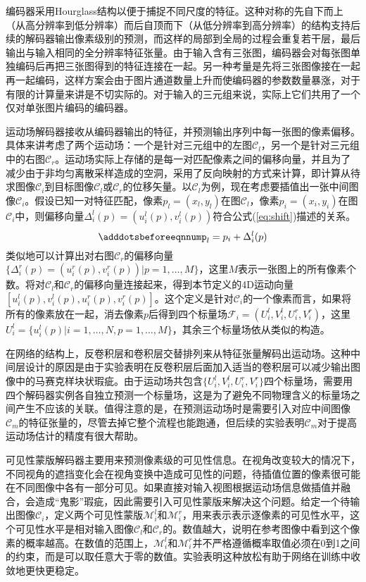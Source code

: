 编码器采用Hourglass结构\citep{newell2016}以便于捕捉不同尺度的特征。这种对称的先自下而上（从高分辨率到低分辨率）而后自顶而下（从低分辨率到高分辨率）的结构支持后续的解码器输出像素级别的预测，而这样的局部到全局的过程会重复若干层，最后输出与输入相同的全分辨率特征张量。由于输入含有三张图，编码器会对每张图单独编码后再把三张图得到的特征连接在一起。另一种考量是先将三张图像接在一起再一起编码，这样方案会由于图片通道数量上升而使编码器的参数数量暴涨，对于有限的计算量来讲是不切实际的。对于输入的三元组来说，实际上它们共用了一个仅对单张图片编码的编码器。

运动场解码器接收从编码器输出的特征，并预测输出序列中每一张图的像素偏移。具体来讲考虑了两个运动场：一个是针对三元组中的左图$\mathcal{C}_l$，另一个是针对三元组中的右图$\mathcal{C}_r$。运动场实际上存储的是每一对匹配像素之间的偏移向量，并且为了减少由于非均匀离散采样造成的空洞，采用了反向映射的方式来计算，即计算从待求图像$\mathcal{C}_i$到目标图像$\mathcal{C}_l$或$\mathcal{C}_r$的位移矢量。以$\mathcal{C}_l$为例，现在考虑要插值出一张中间图像$\mathcal{C}_i$。假设已知一对特征匹配，像素$p_l=(x_l, y_l)$在图$\mathcal{C}_l$，像素$p_i=(x_i, y_i)$在图$\mathcal{C}_i$中，则偏移向量$\Delta_i^l(p)=(u_i^l(p), v_i^l(p))$符合公式(\ref{eq:shift})描述的关系。
\begin{equation}\label{eq:shift}
    \adddotsbeforeeqnnum%
    p_l = p_i + \Delta_i^l(p)
\end{equation}
类似地可以计算出对右图$\mathcal{C}_r$的偏移向量$\{\Delta_i^r(p)=(u_i^r(p), v_i^r(p)) | p = 1, \dots, M\}$，这里$M$表示一张图上的所有像素个数。将对$\mathcal{C}_l$和$\mathcal{C}_r$的偏移向量连接起来，得到本节定义的4D运动向量$[u_i^l(p), v_i^l(p), u_i^r(p), v_i^r(p)]$。这个定义是针对$\mathcal{C}_i$的一个像素而言，如果将所有的像素放在一起，消去像素$p$后得到四个标量场$\mathcal{F}_i=(U_i^l, V_i^l, U_i^r, V_i^r)$，这里$U_i^l=\{u_i^l(p)|i=1,\dots,N, p=1, \dots, M \}$，其余三个标量场依从类似的构造。

在网络的结构上，反卷积层和卷积层交替排列来从特征张量解码出运动场。这种中间层设计的原因是由于实验表明在反卷积层后面加入适当的卷积层可以减少输出图像中的马赛克样块状瑕疵。由于运动场共包含$\{U_i^l, V_i^l, U_i^r, V_i^r\}$四个标量场，需要用四个解码器实例各自独立预测一个标量场，这是为了避免不同物理含义的标量场之间产生不应该的关联。值得注意的是，在预测运动场时是需要引入对应中间图像$\mathcal{C}_m$的特征张量的，尽管去掉它整个流程也能跑通，但后续的实验表明$\mathcal{C}_m$对于提高运动场估计的精度有很大帮助。

可见性蒙版解码器主要用来预测像素级的可见性信息。在视角改变较大的情况下，不同视角的遮挡变化会在视角变换中造成可见性的问题，待插值位置的像素很可能在不同图像中各有一部分可见。如果直接对输入视图根据运动场信息做插值并融合，会造成“鬼影”瑕疵，因此需要引入可见性蒙版来解决这个问题。给定一个待输出图像$\mathcal{C}_i$，定义两个可见性蒙版$\mathcal{M}_i^l$和$\mathcal{M}_i^r$，用来表示表示逐像素的可见性水平，这个可见性水平是相对输入图像$\mathcal{C}_l$和$\mathcal{C}_r$的。数值越大，说明在参考图像中看到这个像素的概率越高。在数值的范围上，$\mathcal{M}_i^l$和$\mathcal{M}_i^r$并不严格遵循概率取值必须在0到1之间的约束，而是可以取任意大于零的数值。实验表明这种放松有助于网络在训练中收敛地更快更稳定。

